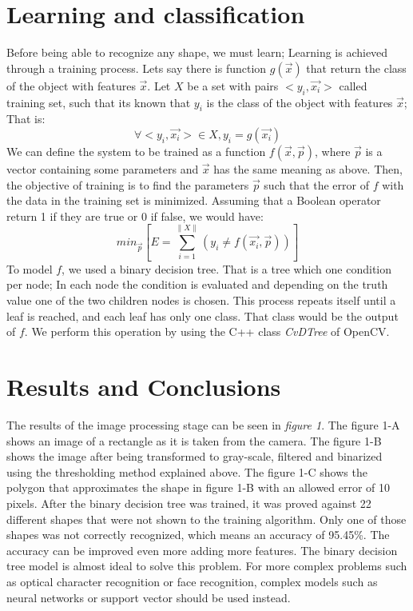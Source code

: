 \documentclass[10pt,journal]{IEEEtran}
\begin{document}
	\section{Learning and classification}
	Before being able to recognize any shape, we must learn; Learning is achieved
	through a training process.  Lets say there is function $g(\vec{x})$ that 
	return the class of the object with features $\vec{x}$. 
	Let $X$ be a set with pairs $<y_i,\vec{x_i}>$ called training set, such that
	its known that $y_i$ is the class of the object with features $\vec{x}$; That is:
	\[ \forall <y_i,\vec{x_i}> \in X , y_i=g(\vec{x_i}) \]
	We can define the system to be trained as a function $f(\vec{x},\vec{p})$,
	where $\vec{p}$ is a vector containing some parameters and $\vec{x}$ has
	the same meaning as above. Then, the objective of training is to find the
	parameters $\vec{p}$ such that the error of $f$ with the data in the training
	set is minimized. Assuming that a Boolean operator return 1 if they are true
	or 0 if false, we would have:
	\[ min_{\vec{p}} \left[ E = \sum_{i=1}^{\| X \|}  
		( y_i \not= f(\vec{x_i},\vec{p}) ) \right] \]
	To model $f$, we used a binary decision tree. That is a tree which one
	condition per node; In each node the condition is evaluated and depending
	on the truth value one of the two children nodes is chosen. This process
	repeats itself until a leaf is reached, and each leaf has only one class.
	That class would be the output of $f$. We perform this operation by using the
	C++ class \textit{CvDTree} of OpenCV. 
	
	\section{Results and Conclusions}
	The results of the image processing stage can be seen in \textit{figure 1}. The
	figure 1-A shows an image of a rectangle as it is taken from the camera. The 
	figure 1-B shows the image after being transformed to gray-scale, filtered and 
	binarized using	the thresholding method explained above. The figure 1-C shows the
	polygon that approximates the shape in figure 1-B with an allowed error of 10
	pixels.\newline
	After the binary decision tree was trained, it was proved against 22 different
	shapes that were not shown to the training algorithm. Only one of those shapes
	was not correctly recognized, which means an accuracy of 95.45\%. The accuracy can
	be improved even more adding more features.
	The binary decision tree model is almost ideal to solve this problem. For
	more complex problems such as optical character recognition or face recognition,
	complex models such as neural networks or support vector should be used instead.
	
\end{document}
